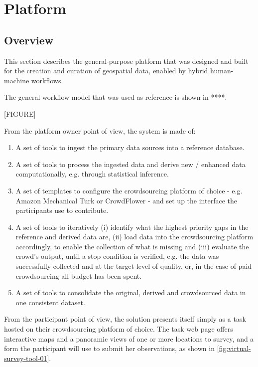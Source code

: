\section{Platform}

\subsection{Overview}

This section describes the general-purpose platform that was designed and built for the creation and curation of geospatial data, enabled by hybrid human-machine workflows. 

The general workflow model that was used as reference is shown in ****.

[FIGURE]

From the platform owner point of view, the system is made of:

\begin{enumerate}
    \item A set of tools to ingest the primary data sources into a reference database.
    \item A set of tools to process the ingested data and derive new / enhanced data computationally, e.g. through statistical inference.
    \item A set of templates to configure the crowdsourcing platform of choice - e.g. Amazon Mechanical Turk or CrowdFlower - and set up the interface the participants use to contribute.
    \item A set of tools to iteratively (i) identify what the highest priority gaps in the reference and derived data are, (ii) load data into the crowdsourcing platform accordingly, to enable the collection of what is missing and (iii) evaluate the crowd's output, until a stop condition is verified, e.g. the data was successfully collected and at the target level of quality, or, in the case of paid crowdsourcing all budget has been spent.
    \item A set of tools to consolidate the original, derived and crowdsourced data in one consistent dataset.
\end{enumerate}

From the participant point of view, the solution presents itself simply as a task hosted on their crowdsourcing platform of choice. The task web page offers interactive maps and a panoramic views of one or more locations to survey, and a form the participant will use to submit her observations, as shown in \ref{fig:virtual-survey-tool-01}. 


